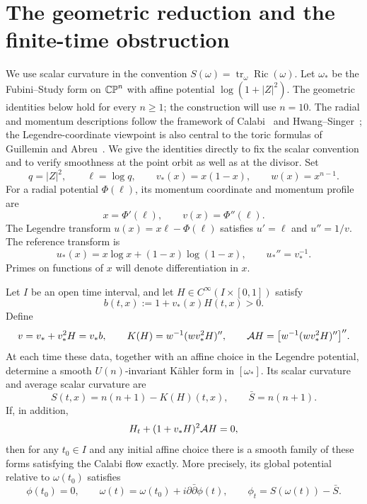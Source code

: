 \section{The geometric reduction and the finite-time obstruction}
\label{geo:section}
\label{sec:geometry}

We use scalar curvature in the convention
\(S(\omega)=\operatorname{tr}_{\omega}\operatorname{Ric}(\omega)\).
Let \(\omega_*\) be the Fubini--Study form on \(\mathbb{CP}^n\) with affine
potential \(\log(1+|Z|^2)\).  The geometric identities below hold for every
\(n\geq1\); the construction will use \(n=10\).
The radial and momentum descriptions follow the framework of
Calabi~\cite{Calabi1979} and Hwang--Singer~\cite{HwangSinger2002};
the Legendre-coordinate viewpoint is also central to the toric formulas
of Guillemin and Abreu~\cite{Guillemin1994,Abreu1998}. We give the
identities directly to fix the scalar convention and to verify
smoothness at the point orbit as well as at the divisor.
Set
\begin{equation}\label{geo:reference}
 q=|Z|^2,\qquad \ell=\log q,\qquad
 v_*(x)=x(1-x),\qquad w(x)=x^{n-1}.
\end{equation}
For a radial potential \(\Phi(\ell)\), its momentum coordinate and
momentum profile are
\[
 x=\Phi'(\ell),\qquad v(x)=\Phi''(\ell).
\]
The Legendre transform \(u(x)=x\ell-\Phi(\ell)\) satisfies
\(u'=\ell\) and \(u''=1/v\).  The reference transform is
\[
 u_*(x)=x\log x+(1-x)\log(1-x),\qquad u_*''=v_*^{-1}.
\]
Primes on functions of \(x\) will denote differentiation in \(x\).

\begin{proposition}\label{geo:reduction}
Let \(I\) be an open time interval, and let
\(H\in C^\infty(I\times[0,1])\) satisfy
\begin{equation}\label{geo:positivity}
 b(t,x):=1+v_*(x)H(t,x)>0.
\end{equation}
Define
\begin{equation}\label{geo:momentum}
 v=v_*+v_*^2H=v_*b,\qquad
 K(H)=w^{-1}(wv_*^2H)'',\qquad
 \mathcal A H=\big[w^{-1}(wv_*^2H)''\big]''.
\end{equation}
At each time these data, together with an affine choice in the Legendre
potential, determine a smooth \(U(n)\)-invariant K\"ahler form in
\([\omega_*]\).  Its scalar curvature and average scalar curvature are
\begin{equation}\label{geo:scalar}
 S(t,x)=n(n+1)-K(H)(t,x),\qquad \bar S=n(n+1).
\end{equation}
If, in addition,
\begin{equation}\label{geo:equation}
 H_t+(1+v_*H)^2\mathcal A H=0,
\end{equation}
then for any \(t_0\in I\) and any initial affine choice there is a smooth
family of these forms satisfying the Calabi flow exactly.  More
precisely, its global potential relative to \(\omega(t_0)\) satisfies
\begin{equation}\label{geo:potential-flow}
 \phi(t_0)=0,\qquad
 \omega(t)=\omega(t_0)+i\partial\bar\partial\phi(t),\qquad
 \phi_t=S(\omega(t))-\bar S.
\end{equation}
\end{proposition}


